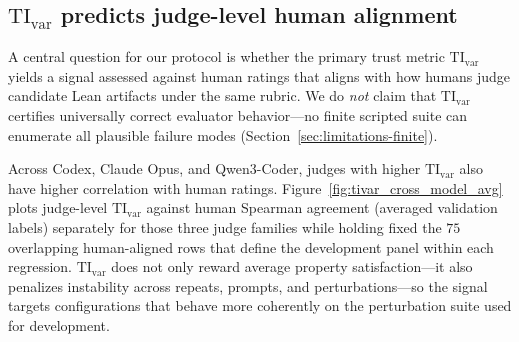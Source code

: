 \documentclass{article}
\begin{document}
\subsection{\texorpdfstring{\(\mathrm{TI}_{\mathrm{var}}\)}{TI-var} predicts judge-level human alignment}
\label{sec:tivar_cross_model_results}
\label{sec:validation-human-alignment}

A central question for our protocol is whether the primary trust metric \(\mathrm{TI}_{\mathrm{var}}\) yields a signal assessed against human ratings that aligns with how humans judge candidate Lean artifacts under the same rubric. We do \emph{not} claim that \(\mathrm{TI}_{\mathrm{var}}\) certifies universally correct evaluator behavior---no finite scripted suite can enumerate all plausible failure modes (Section~\ref{sec:limitations-finite}).

Across Codex, Claude Opus, and Qwen3-Coder, judges with higher \(\mathrm{TI}_{\mathrm{var}}\) also have higher correlation with human ratings. Figure~\ref{fig:tivar_cross_model_avg} plots judge-level \(\mathrm{TI}_{\mathrm{var}}\) against human Spearman agreement (averaged validation labels) separately for those three judge families while holding fixed the \(75\) overlapping human-aligned rows that define the development panel within each regression. \(\mathrm{TI}_{\mathrm{var}}\) does not only reward average property satisfaction---it also penalizes instability across repeats, prompts, and perturbations---so the signal targets configurations that behave more coherently on the perturbation suite used for development.
\end{document}
